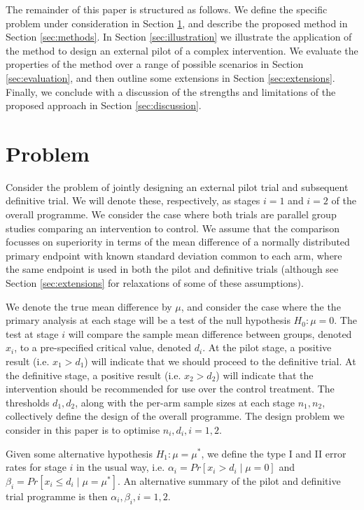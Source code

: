 \documentclass[sagev, Crown]{sagej} %
\begin{document}
The remainder of this paper is structured as follows. We define the specific problem under consideration in Section \ref{sec:problem}, and describe the proposed method in Section \ref{sec:methods}. In Section \ref{sec:illustration} we illustrate the application of the method to design an external pilot of a complex intervention. We evaluate the properties of the method over a range of possible scenarios in Section \ref{sec:evaluation}, and then outline some extensions in Section \ref{sec:extensions}. Finally, we conclude with a discussion of the strengths and limitations of the proposed approach in Section \ref{sec:discussion}.


\section{Problem}\label{sec:problem}

Consider the problem of jointly designing an external pilot trial and subsequent definitive trial. We will denote these, respectively, as stages $i=1$ and $i=2$ of the overall programme. We consider the case where both trials are parallel group studies comparing an intervention to control. We assume that the comparison focusses on superiority in terms of the mean difference of a normally distributed primary endpoint with known standard deviation common to each arm, where the same endpoint is used in both the pilot and definitive trials (although see Section \ref{sec:extensions} for relaxations of some of these assumptions). 

We denote the true mean difference by $\mu$, and consider the case where the the primary analysis at each stage will be a test of the null hypothesis $H_0: \mu = 0$. The test at stage $i$ will compare the sample mean difference between groups, denoted  $x_i$, to a pre-specified critical value, denoted $d_i$. At the pilot stage, a positive result (i.e. $x_1 > d_1$) will indicate that we should proceed to the definitive trial. At the definitive stage, a positive result (i.e. $x_2 > d_2$) will indicate that the intervention should be recommended for use over the control treatment. The thresholds $d_1, d_2$, along with the per-arm sample sizes at each stage $n_1, n_2$, collectively define the design of the overall programme. The design problem we consider in this paper is to optimise $n_i, d_i, i = 1,2$.

Given some alternative hypothesis $H_1: \mu =\mu^*$, we define the type I and II error rates for stage $i$ in the usual way, i.e. $\alpha_i = Pr[x_i > d_i \mid \mu = 0]$ and $\beta_i = Pr[x_i \leq d_i \mid \mu = \mu^*]$. An alternative summary of the pilot and definitive trial programme is then  $\alpha_i, \beta_i, i=1,2$.
\end{document}
